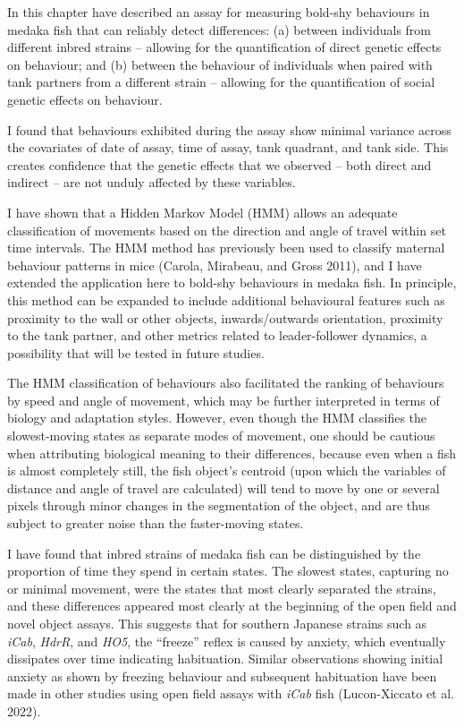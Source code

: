 \documentclass[
]{book}
\begin{document}
In this chapter have described an assay for measuring bold-shy behaviours in medaka fish that can reliably detect differences: (a) between individuals from different inbred strains -- allowing for the quantification of direct genetic effects on behaviour; and (b) between the behaviour of individuals when paired with tank partners from a different strain -- allowing for the quantification of social genetic effects on behaviour.

I found that behaviours exhibited during the assay show minimal variance across the covariates of date of assay, time of assay, tank quadrant, and tank side. This creates confidence that the genetic effects that we observed -- both direct and indirect -- are not unduly affected by these variables.

I have shown that a Hidden Markov Model (HMM) allows an adequate classification of movements based on the direction and angle of travel within set time intervals. The HMM method has previously been used to classify maternal behaviour patterns in mice (Carola, Mirabeau, and Gross 2011), and I have extended the application here to bold-shy behaviours in medaka fish. In principle, this method can be expanded to include additional behavioural features such as proximity to the wall or other objects, inwards/outwards orientation, proximity to the tank partner, and other metrics related to leader-follower dynamics, a possibility that will be tested in future studies.

The HMM classification of behaviours also facilitated the ranking of behaviours by speed and angle of movement, which may be further interpreted in terms of biology and adaptation styles. However, even though the HMM classifies the slowest-moving states as separate modes of movement, one should be cautious when attributing biological meaning to their differences, because even when a fish is almost completely still, the fish object's centroid (upon which the variables of distance and angle of travel are calculated) will tend to move by one or several pixels through minor changes in the segmentation of the object, and are thus subject to greater noise than the faster-moving states.

I have found that inbred strains of medaka fish can be distinguished by the proportion of time they spend in certain states. The slowest states, capturing no or minimal movement, were the states that most clearly separated the strains, and these differences appeared most clearly at the beginning of the open field and novel object assays. This suggests that for southern Japanese strains such as \emph{iCab}, \emph{HdrR}, and \emph{HO5}, the ``freeze'' reflex is caused by anxiety, which eventually dissipates over time indicating habituation. Similar observations showing initial anxiety as shown by freezing behaviour and subsequent habituation have been made in other studies using open field assays with \emph{iCab} fish (Lucon-Xiccato et al. 2022).
\end{document}
